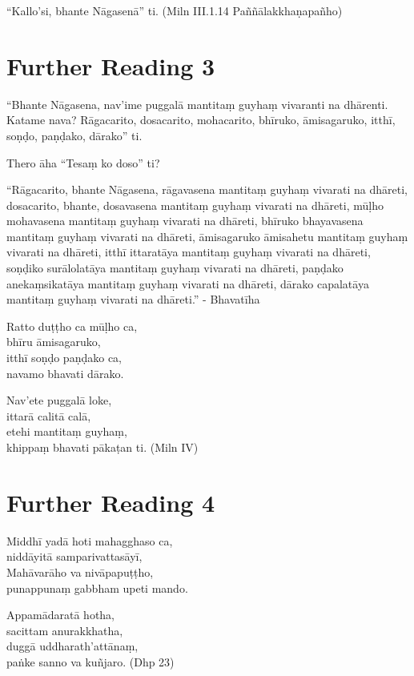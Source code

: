 “Kallo’si, bhante Nāgasenā” ti. \hfill(Miln III.1.14 Paññālakkhaṇapañho)

\section*{Further Reading 3}

“Bhante Nāgasena, nav’ime puggalā mantitaṃ guyhaṃ vivaranti na dhārenti. Katame nava? Rāgacarito, dosacarito, mohacarito, bhīruko, āmisagaruko, itthī, soṇḍo, paṇḍako, dārako” ti.

Thero āha “Tesaṃ ko doso” ti?

“Rāgacarito, bhante Nāgasena, rāgavasena mantitaṃ guyhaṃ vivarati na dhāreti, dosacarito, bhante, dosavasena mantitaṃ guyhaṃ vivarati na dhāreti, mūḷho mohavasena mantitaṃ guyhaṃ vivarati na dhāreti, bhīruko bhayavasena mantitaṃ guyhaṃ vivarati na dhāreti, āmisagaruko āmisahetu mantitaṃ guyhaṃ vivarati na dhāreti, itthī ittaratāya mantitaṃ guyhaṃ vivarati na dhāreti, soṇḍiko surālolatāya mantitaṃ guyhaṃ vivarati na dhāreti, paṇḍako anekaṃsikatāya mantitaṃ guyhaṃ vivarati na dhāreti, dārako capalatāya mantitaṃ guyhaṃ vivarati na dhāreti.” - Bhavatīha

Ratto duṭṭho ca mūḷho ca,\\
bhīru āmisagaruko,\\
itthī soṇḍo paṇḍako ca,\\
navamo bhavati dārako.

Nav’ete puggalā loke,\\
ittarā calitā calā,\\
etehi mantitaṃ guyhaṃ,\\
khippaṃ bhavati pākaṭan ti. \hfill\hfill(Miln IV)

\section*{Further Reading 4}

Middhī yadā hoti mahagghaso ca,\\
niddāyitā samparivattasāyī,\\
Mahāvarāho va nivāpapuṭṭho,\\
punappunaṃ gabbham upeti mando.

Appamādaratā hotha,\\
sacittam anurakkhatha,\\
duggā uddharath’attānaṃ,\\
paṅke sanno va kuñjaro. \hfill(Dhp 23)